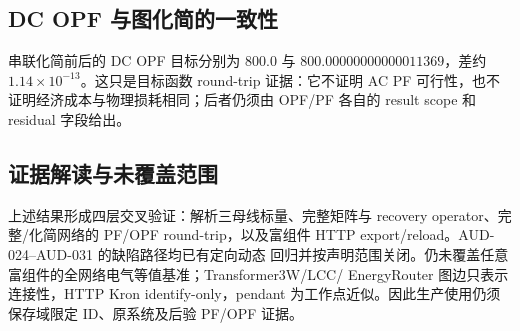 \subsection{DC OPF 与图化简的一致性}

串联化简前后的 DC OPF 目标分别为
\(800.0\) 与 \(800.00000000000011369\)，差约
\(1.14\times10^{-13}\)。这只是目标函数 round-trip 证据：它不证明 AC PF
可行性，也不证明经济成本与物理损耗相同；后者仍须由 OPF/PF 各自的 result scope
和 residual 字段给出。

\subsection{证据解读与未覆盖范围}

上述结果形成四层交叉验证：解析三母线标量、完整矩阵与 recovery operator、完整/化简网络的
PF/OPF round-trip，以及富组件 HTTP export/reload。AUD-024--AUD-031 的缺陷路径均已有定向动态
回归并按声明范围关闭。仍未覆盖任意富组件的全网络电气等值基准；Transformer3W/LCC/
EnergyRouter 图边只表示连接性，HTTP Kron identify-only，pendant 为工作点近似。因此生产使用仍须
保存域限定 ID、原系统及后验 PF/OPF 证据。
